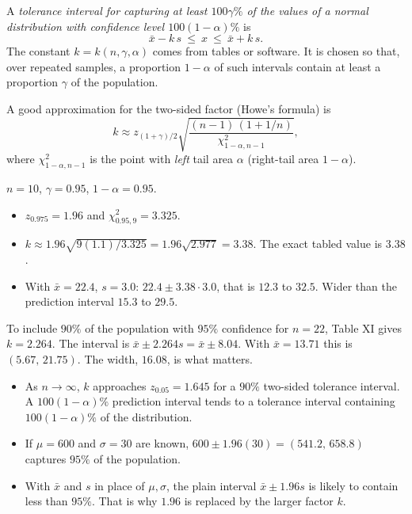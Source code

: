 \begin{definition}
A \emph{tolerance interval for capturing at least $100\gamma\%$ of the values of a normal distribution with confidence level $100(1-\alpha)\%$} is
\[ \bar{x}-k\,s\ \le\ x\ \le\ \bar{x}+k\,s. \]
The constant $k=k(n,\gamma,\alpha)$ comes from tables or software. It is chosen so that, over repeated samples, a proportion $1-\alpha$ of such intervals contain at least a proportion $\gamma$ of the population.
\end{definition}

A good approximation for the two-sided factor (Howe's formula) is
\[ k\approx z_{(1+\gamma)/2}\sqrt{\frac{(n-1)\,(1+1/n)}{\chi^2_{1-\alpha,n-1}}}, \]
where $\chi^2_{1-\alpha,n-1}$ is the point with \emph{left} tail area $\alpha$ (right-tail area $1-\alpha$).

\begin{example}
$n=10$, $\gamma=0.95$, $1-\alpha=0.95$.
\begin{itemize}
  \item $z_{0.975}=1.96$ and $\chi^2_{0.95,9}=3.325$.
  \item $k\approx1.96\sqrt{9(1.1)/3.325}=1.96\sqrt{2.977}=3.38$. The exact tabled value is $3.38$.
  \item With $\bar{x}=22.4$, $s=3.0$: $22.4\pm3.38\cdot3.0$, that is $12.3$ to $32.5$. Wider than the prediction interval $15.3$ to $29.5$.
\end{itemize}
\end{example}

\begin{example}
To include $90\%$ of the population with $95\%$ confidence for $n=22$, Table XI gives $k=2.264$. The interval is $\bar{x}\pm2.264s=\bar{x}\pm8.04$. With $\bar{x}=13.71$ this is $(5.67,\,21.75)$. The width, $16.08$, is what matters.
\begin{itemize}
  \item As $n\to\infty$, $k$ approaches $z_{0.05}=1.645$ for a $90\%$ two-sided tolerance interval. A $100(1-\alpha)\%$ prediction interval tends to a tolerance interval containing $100(1-\alpha)\%$ of the distribution.
  \item If $\mu=600$ and $\sigma=30$ are known, $600\pm1.96(30)=(541.2,\,658.8)$ captures $95\%$ of the population.
  \item With $\bar{x}$ and $s$ in place of $\mu,\sigma$, the plain interval $\bar{x}\pm1.96s$ is likely to contain less than $95\%$. That is why $1.96$ is replaced by the larger factor $k$.
\end{itemize}
\end{example}

